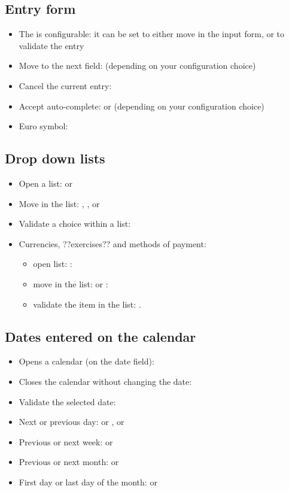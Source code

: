 \subsection{Entry form}

\begin{itemize}
	\item The  is configurable: it can be set to either move in the input form, or to validate the entry
	\item Move to the next field:  (depending on your configuration choice)
	\item Cancel the current entry: 
	\item Accept auto-complete:  or  (depending on your configuration choice)
	\item  Euro symbol: 
\end{itemize}

\subsection{Drop down lists}

\begin{itemize}
	 \item Open a list:  or 
	 \item Move in the list: , ,  or 
	 \item Validate a choice within a list: 
	 \item Currencies, ??exercises?? and methods of payment:
		\begin{itemize}
			\item open list: : 
			\item move in the list:  or :
			\item validate the item in the list: .
		\end{itemize}
\end{itemize}


\subsection{Dates entered on the calendar}

\begin{itemize}
	\item Opens a calendar (on the date field): 
	\item Closes the calendar without changing the date: 
	\item Validate the selected date: 
	\item Next or previous day: \key{+} or \key{-},  or 
	\item Previous or next week:  or 
	\item Previous or next month:  or 
	\item First day or last day of the month:  or 
\end{itemize}


